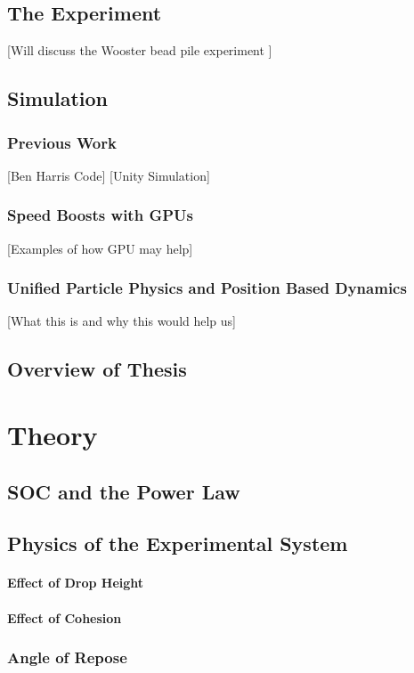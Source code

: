 \documentclass{book}
\begin{document}
\section{The Experiment}
[Will discuss the Wooster bead pile experiment ]

\section{Simulation}
\subsection{Previous Work}
[Ben Harris Code]
[Unity Simulation]
\subsection{Speed Boosts with GPUs}
[Examples of how GPU may help]
\subsection{Unified Particle Physics and Position Based Dynamics}
[What this is and why this would help us]


\section{Overview of Thesis}


\chapter{Theory}

\section{SOC and the Power Law}
\section{Physics of the Experimental System}
\subsubsection{Effect of Drop Height}
\subsubsection{Effect of Cohesion}
\subsection{Angle of Repose}
\end{document}
